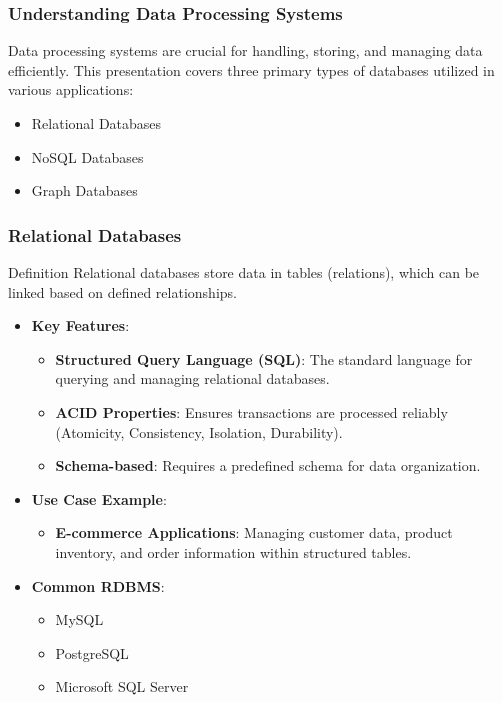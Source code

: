 \documentclass[aspectratio=169]{beamer}
\begin{document}
\begin{frame}[fragile]
    \frametitle{Understanding Data Processing Systems}
    Data processing systems are crucial for handling, storing, and managing data efficiently. This presentation covers three primary types of databases utilized in various applications:
    \begin{itemize}
        \item Relational Databases 
        \item NoSQL Databases
        \item Graph Databases
    \end{itemize}
\end{frame}

\begin{frame}[fragile]
    \frametitle{Relational Databases}
    \begin{block}{Definition}
        Relational databases store data in tables (relations), which can be linked based on defined relationships.
    \end{block}
    
    \begin{itemize}
        \item \textbf{Key Features}:
        \begin{itemize}
            \item \textbf{Structured Query Language (SQL)}: The standard language for querying and managing relational databases.
            \item \textbf{ACID Properties}: Ensures transactions are processed reliably (Atomicity, Consistency, Isolation, Durability).
            \item \textbf{Schema-based}: Requires a predefined schema for data organization.
        \end{itemize}

        \item \textbf{Use Case Example}:
        \begin{itemize}
            \item \textbf{E-commerce Applications}: Managing customer data, product inventory, and order information within structured tables.
        \end{itemize}
        
        \item \textbf{Common RDBMS}:
        \begin{itemize}
            \item MySQL
            \item PostgreSQL
            \item Microsoft SQL Server
        \end{itemize}
    \end{itemize}
\end{frame}
\end{document}
